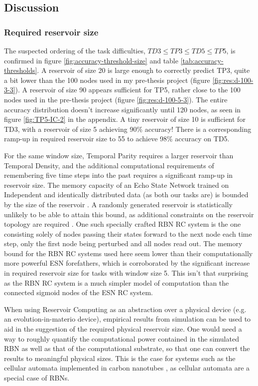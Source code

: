 \subsection{Discussion}

\subsubsection{Required reservoir size}

The suspected ordering of the task difficulties,
$ TD3 \leq TP3 \leq TD5 \leq TP5 $,
is confirmed in figure \ref{fig:accuracy-threshold-size} and table \ref{tab:accuracy-thresholds}.
A reservoir of size 20 is large enough to correctly predict TP3,
quite a bit lower than the 100 nodes used in my pre-thesis project (figure \ref{fig:res:d-100-3-3}).
A reservoir of size 90 appears sufficient for TP5, rather close to the 100 nodes used in the pre-thesis project (figure \ref{fig:res:d-100-5-3}).
The entire accuracy distribution doesn't increase significantly until 120 nodes,
as seen in figure \ref{fig:TP5-IC-2} in the appendix.
A tiny reservoir of size 10 is sufficient for TD3,
with a reservoir of size 5 achieving 90\% accuracy!
There is a corresponding ramp-up in required reservoir size to 55 to achieve 98\% accuracy on TD5.

For the same window size, Temporal Parity requires a larger reservoir than Temporal Density,
and the additional computational requirements of remembering five time steps into the past requires a significant ramp-up in reservoir size.
The memory capacity of an Echo State Network trained on Independent and identically distributed data (as both our tasks are) is bounded by the size of the reservoir \cite{Jaeger:2007}.
A randomly generated reservoir is statistically unlikely to be able to attain this bound,
as additional constraints on the reservoir topology are required \cite{Jaeger:2007}.
One such specially crafted RBN RC system is the one consisting solely of nodes passing their states forward to the next node each time step,
only the first node being perturbed and all nodes read out.
The memory bound for the RBN RC systems used here seem lower than their computationally more powerful ESN forefathers,
which is corroborated by the significant increase in required reservoir size for tasks with window size 5.
This isn't that surprising as the RBN RC system is a much simpler model of computation than the connected sigmoid nodes of the ESN RC system.

When using Reservoir Computing as an abstraction over a physical device (e.g. an evolution-in-materio device),
empirical results from simulation can be used to aid in the suggestion of the required physical reservoir size.
One would need a way to roughly quantify the computational power contained in the simulated RBN as well as that of the computational substrate,
so that one can convert the results to meaningful physical sizes.
This is the case for systems such as the cellular automata implemented in carbon nanotubes \cite{farstad2015evolving},
as cellular automata are a special case of RBNs.

